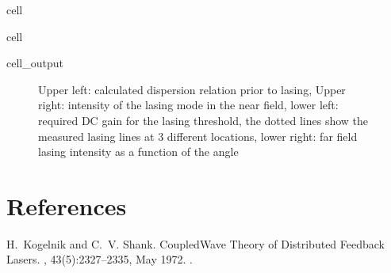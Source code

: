 \documentclass[a4paper,10pt,english,openany,oneside]{jupyterBook}
\begin{document}
\begin{sphinxuseclass}{cell}
\end{sphinxuseclass}
\begin{sphinxuseclass}{cell}\begin{sphinxVerbatimOutput}

\begin{sphinxuseclass}{cell_output}
\begin{figure}[htbp]
\centering
\capstart

\noindent{}
\caption{Upper left: calculated dispersion relation prior to lasing, Upper right: intensity of the lasing mode in the near field, lower left: required DC gain for the lasing threshold, the dotted lines show the measured lasing lines at 3 different locations, lower right: far field lasing intensity as a function of the angle}\label{\detokenize{NanoimprintedDFB:iakov1}}\end{figure}

\end{sphinxuseclass}\end{sphinxVerbatimOutput}

\end{sphinxuseclass}
\sphinxstepscope


\chapter{References}
\label{\detokenize{bib:references}}\label{\detokenize{bib::doc}}
\begin{sphinxthebibliography}{1}
\sphinxAtStartPar
H. Kogelnik and C. V. Shank. Coupled\sphinxhyphen{}Wave Theory of Distributed Feedback Lasers. , 43(5):2327–2335, May 1972. .
\end{sphinxthebibliography}







\renewcommand{\indexname}{Index}
\printindex
\end{document}
